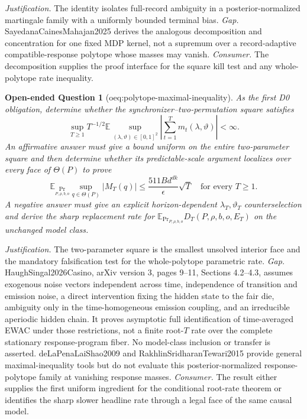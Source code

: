 \documentclass{article}
\newtheorem{openendedquestion}{Open-ended Question}
\begin{document}
\par\smallskip\noindent \textit{Justification.} The identity isolates full-record ambiguity in a posterior-normalized martingale family with a uniformly bounded terminal bias. \textit{Gap.} SayedanaCainesMahajan2025 derives the analogous decomposition and concentration for one fixed MDP kernel, not a supremum over a record-adaptive compatible-response polytope whose masses may vanish. \textit{Consumer.} The decomposition supplies the proof interface for the square kill test and any whole-polytope rate inequality.

\begin{openendedquestion}[oeq:polytope-maximal-inequality]\label{oeq:polytope-maximal-inequality}
As the first D0 obligation, determine whether the synchronizer--two-permutation square satisfies \[\sup_{T\ge1}T^{-1/2}\mathbb E\sup_{(\lambda,\vartheta)\in[0,1]^2}\left|\sum_{t=1}^T m_t(\lambda,\vartheta)\right|<\infty.\] An affirmative answer must give a bound uniform on the entire two-parameter square and then determine whether its predictable-scale argument localizes over every face of \(\Theta(P)\) to prove \[\mathbb E_{\Pr_{P,\rho,b,o}}\sup_{q\in\Theta(P)}|M_T(q)|\le \frac{511B d^{dk}}{\epsilon}\sqrt T\quad\text{for every }T\ge1.\] A negative answer must give an explicit horizon-dependent \(\lambda_T,\vartheta_T\) counterselection and derive the sharp replacement rate for \(\mathbb E_{\Pr_{P,\rho,b,o}}D_T(P,\rho,b,o,E_T)\) on the unchanged model class.
\end{openendedquestion}
\par\smallskip\noindent \textit{Justification.} The two-parameter square is the smallest unsolved interior face and the mandatory falsification test for the whole-polytope parametric rate. \textit{Gap.} HaughSingal2026Casino, arXiv version 3, pages 9--11, Sections 4.2--4.3, assumes exogenous noise vectors independent across time, independence of transition and emission noise, a direct intervention fixing the hidden state to the fair die, ambiguity only in the time-homogeneous emission coupling, and an irreducible aperiodic hidden chain. It proves asymptotic full identification of time-averaged EWAC under those restrictions, not a finite root-\(T\) rate over the complete stationary response-program fiber. No model-class inclusion or transfer is asserted. deLaPenaLaiShao2009 and RakhlinSridharanTewari2015 provide general maximal-inequality tools but do not evaluate this posterior-normalized response-polytope family at vanishing response masses. \textit{Consumer.} The result either supplies the first uniform ingredient for the conditional root-rate theorem or identifies the sharp slower headline rate through a legal face of the same causal model.
\end{document}

